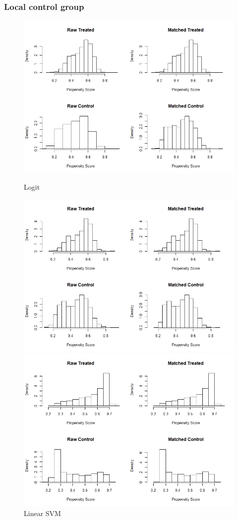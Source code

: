 \documentclass[11pt,a4paper,oneside]{article}
\begin{document}
\subsubsection{Local control group}
\begin{figure}[!t]
  \includegraphics[width=\linewidth]{Figures/local_logit_hist.jpeg}
  \caption{Logit}\label{fig:histogram1}
\endminipage\hfill
{}
  \includegraphics[width=\linewidth]{Figures/local_svm_hist.jpeg}
  \caption{Linear SVM}\label{fig:histogram2}
\endminipage\hfill
{}%
  \includegraphics[width=\linewidth]{Figures/local_ksvm_hist.jpeg}

\end{figure}
\end{document}
